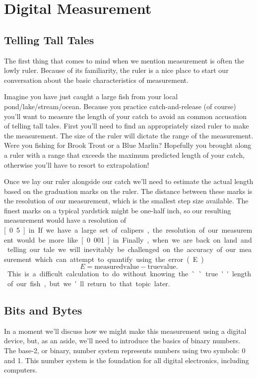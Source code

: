 
\chapter{Digital Measurement}\label{c:measure}
\section{Telling Tall Tales}
The first thing that comes to mind when we mention measurement is often the lowly ruler.  Because of its familiarity, the ruler is a nice place to start our conversation about the basic characteristics of measurement.

Imagine you have just caught a large fish from your local pond/lake/stream/ocean.  Because you practice catch-and-release (of course) you'll want to measure the length of your catch to avoid an common accusation of telling tall tales.  First you'll need to find an appropriately sized ruler to make the measurement.  The size of the ruler will dictate the \gls{range} of the measurement.  Were you fishing for Brook Trout or a Blue Marlin?  Hopefully you brought along a ruler with a range that exceeds the maximum predicted length of your catch, otherwise you'll have to resort to extrapolation!

Once we lay our ruler alongside our catch we'll need to estimate the actual length based on the graduation marks on the ruler.  The distance between these marks is the \gls{resolution} of our measurement, which is the smallest step size available.  The finest marks on a typical yardstick might be one-half inch, so our resulting measurement would have a resolution of \unit[0.5]{in}.  If we have a large set of calipers, the resolution of our measurement would be more like \unit[0.001]{in}.

Finally, when we are back on land and telling our tale we will inevitably be challenged on the \gls{accuracy} of our measurement which can attempt to quantify using the \gls{error} (E)
\begin{equation}
E = \mathrm{measured value} - \mathrm{true value}.
\end{equation}
This is a difficult calculation to do without knowing the ``true'' length of our fish, but we'll return to that topic later.

\section{Bits and Bytes}
In a moment we'll discuss how we might make this measurement using a digital device, but, as an aside, we'll need to introduce the basics of \gls{binary numbers}.  The base-2, or binary, number system represents numbers using two symbols: 0 and 1.  This number system is the foundation for all digital electronics, including computers.  

